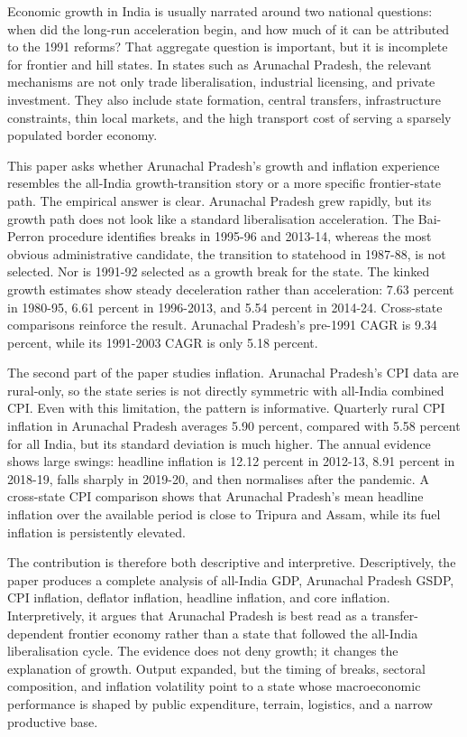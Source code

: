 \documentclass[11pt,a4paper]{article}
\begin{document}
Economic growth in India is usually narrated around two national questions: when did the long-run acceleration begin, and how much of it can be attributed to the 1991 reforms? That aggregate question is important, but it is incomplete for frontier and hill states. In states such as Arunachal Pradesh, the relevant mechanisms are not only trade liberalisation, industrial licensing, and private investment. They also include state formation, central transfers, infrastructure constraints, thin local markets, and the high transport cost of serving a sparsely populated border economy.

This paper asks whether Arunachal Pradesh's growth and inflation experience resembles the all-India growth-transition story or a more specific frontier-state path. The empirical answer is clear. Arunachal Pradesh grew rapidly, but its growth path does not look like a standard liberalisation acceleration. The Bai-Perron procedure identifies breaks in 1995-96 and 2013-14, whereas the most obvious administrative candidate, the transition to statehood in 1987-88, is not selected. Nor is 1991-92 selected as a growth break for the state. The kinked growth estimates show steady deceleration rather than acceleration: 7.63 percent in 1980-95, 6.61 percent in 1996-2013, and 5.54 percent in 2014-24. Cross-state comparisons reinforce the result. Arunachal Pradesh's pre-1991 CAGR is 9.34 percent, while its 1991-2003 CAGR is only 5.18 percent.

The second part of the paper studies inflation. Arunachal Pradesh's CPI data are rural-only, so the state series is not directly symmetric with all-India combined CPI. Even with this limitation, the pattern is informative. Quarterly rural CPI inflation in Arunachal Pradesh averages 5.90 percent, compared with 5.58 percent for all India, but its standard deviation is much higher. The annual evidence shows large swings: headline inflation is 12.12 percent in 2012-13, 8.91 percent in 2018-19, falls sharply in 2019-20, and then normalises after the pandemic. A cross-state CPI comparison shows that Arunachal Pradesh's mean headline inflation over the available period is close to Tripura and Assam, while its fuel inflation is persistently elevated.

The contribution is therefore both descriptive and interpretive. Descriptively, the paper produces a complete analysis of all-India GDP, Arunachal Pradesh GSDP, CPI inflation, deflator inflation, headline inflation, and core inflation. Interpretively, it argues that Arunachal Pradesh is best read as a transfer-dependent frontier economy rather than a state that followed the all-India liberalisation cycle. The evidence does not deny growth; it changes the explanation of growth. Output expanded, but the timing of breaks, sectoral composition, and inflation volatility point to a state whose macroeconomic performance is shaped by public expenditure, terrain, logistics, and a narrow productive base.
\end{document}
